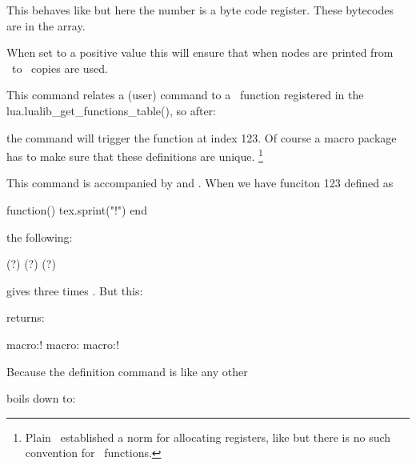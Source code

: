 This behaves like  but here the number is a byte code
register. These bytecodes are in the  array.

\stopnewprimitive

\startnewprimitive[title={\prm {luacopyinputnodes}}]

When set to a positive value this will ensure that when nodes are printed from
\LUA\ to \TEX\ copies are used.

\stopnewprimitive

\startnewprimitive[title={\prm {luadef}}]


This command relates a (user) command to a \LUA\ function registered in the \typ
{lua.lualib_get_functions_table()}, so after:

\starttyping
\luadef{}
\stoptyping

the \type {\foo} command will trigger the function at index 123. Of course a
macro package has to make sure that these definitions are unique. \footnote
{Plain \TEX\ established a norm for allocating registers, like \typ {\newdimen}
but there is no such convention for \LUA\ functions.}

This command is accompanied by  and
. When we have funciton 123 defined as

\starttyping
function() tex.sprint("!") end
\stoptyping

the following:

\starttyping
(\luafunctioncall  \foocode ?)
(\normalluafunction\foocode ?)
(\foo                       ?)
\stoptyping

gives three times . But this:

\starttyping
\edef\oof{\foo                      } \meaning\oof  %
\edef\oof{\luafunctioncall  \foocode} \meaning\oof  %
\edef\oof{\normalluafunction\foocode} \meaning\oof  %
\stoptyping

returns:

\starttyping
macro:!
macro:
macro:!
\stoptyping

Because the definition command is like any other

\starttyping
\permanent\protected\luadef{}
\stoptyping

boils down to:

